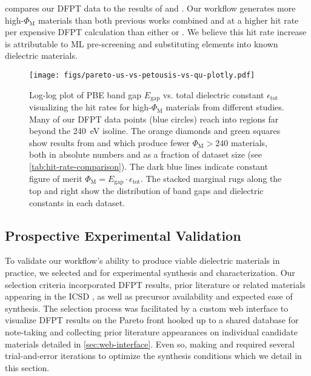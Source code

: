 \documentclass{article}
\newcommand{\fom}[1][]{\Phi_\text{M#1}}
\newcommand{\CsTaTeO}[1][]{\ch{CsTaTeO6#1}}
\newcommand{\BiZrO}[1][]{\ch{Bi2Zr2O7#1}}
\newcommand{\egap}{{E_\text{gap}}}
\newcommand{\epstot}{\epsilon_\text{tot}}
\begin{document}
 compares our DFPT data to the results of \citeauthor*{petousis_high-throughput_2017}\cite{petousis_high-throughput_2017} and \citeauthor*{qu_high_2020}\cite{qu_high_2020}.
Our workflow generates more high-$\fom$ materials than both previous works combined and at a higher hit rate per expensive DFPT calculation than either \citeauthor*{petousis_high-throughput_2017}\cite{petousis_high-throughput_2017} or \citeauthor*{qu_high_2020}\cite{qu_high_2020}.
We believe this hit rate increase is attributable to ML pre-screening and substituting elements into known dielectric materials.

\begin{figure}[t]
    \centering
    \texttt{[image: figs/pareto-us-vs-petousis-vs-qu-plotly.pdf]}
    \caption{
        Log-log plot of PBE band gap $\egap$ vs. total dielectric constant $\epstot$ visualizing the hit rates for high-$\fom$ materials from different studies.
        Many of our DFPT data points (blue circles) reach into regions far beyond the \SI{240}{eV} isoline.
        The orange diamonds and green squares show results from \citeauthor*{petousis_high-throughput_2017}\cite{petousis_high-throughput_2017} and \citeauthor*{qu_high_2020}\cite{qu_high_2020} which produce fewer $\fom > 240$ materials, both in absolute numbers and as a fraction of dataset size (see \cref{tab:hit-rate-comparison}).
        The dark blue lines indicate constant figure of merit $\fom = \egap \cdot \epstot$.
        The stacked marginal rugs along the top and right show the distribution of band gaps and dielectric constants in each dataset.
    }
    \label{fig:pareto-us-vs-qu-vs-petousis}
\end{figure}


\subsection{Prospective Experimental Validation}
\label{sec:experimental-results}

To validate our workflow's ability to produce viable dielectric materials in practice, we selected \CsTaTeO{} and \BiZrO{} for experimental synthesis and characterization.
Our selection criteria incorporated DFPT results, prior literature or related materials appearing in the ICSD \cite{zagorac_recent_2019}, as well as precursor availability and expected ease of synthesis.
The selection process was facilitated by a custom web interface to visualize DFPT results on the Pareto front hooked up to a shared database for note-taking and collecting prior literature appearances on individual candidate materials detailed in \cref{sec:web-interface}.
Even so, making \CsTaTeO{} and \BiZrO{} required several trial-and-error iterations to optimize the synthesis conditions which we detail in this section.
\end{document}
